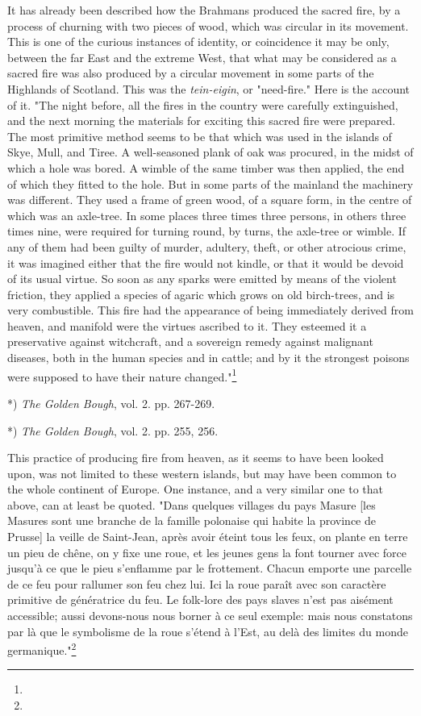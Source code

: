 \documentclass[a4paper, 11pt, oneside, polutonikogreek, english]{article}
\begin{document}
It has already been described how the Brahmans produced the sacred fire, by a process of churning with two pieces of wood, which was circular in its movement. This is one of the curious instances of identity, or coincidence it may be only, between the far East and the extreme West, that what may be considered as a sacred fire was also produced by a circular movement in some parts of the Highlands of Scotland. This was the \emph{tein-eigin}, or "need-fire." Here is the account of it. "The night before, all the fires in the country were carefully extinguished, and the next morning the materials for exciting this sacred fire were prepared. The most primitive method seems to be that which was used in the islands of Skye, Mull, and Tiree. A well-seasoned plank of oak was procured, in the midst of which a hole was bored. A wimble of the same timber was then applied, the end of which they fitted to the hole. But in some parts of the mainland the machinery was different. They used a frame of green wood, of a square form, in the centre of which was an axle-tree. In some places three times three persons, in others three times nine, were required for turning round, by turns, the axle-tree or wimble. If any of them had been guilty of murder, adultery, theft, or other atrocious crime, it was imagined either that the fire would not kindle, or that it would be devoid of its usual virtue. So soon as any sparks were emitted by means of the violent friction, they applied a species of agaric which grows on old birch-trees, and is very combustible. This fire had the appearance of being immediately derived from heaven, and manifold were the virtues ascribed to it. They esteemed it a preservative against witchcraft, and a sovereign remedy against malignant diseases, both in the human species and in cattle; and by it the strongest poisons were supposed to have their nature changed."\footnote{}

*) \emph{The Golden Bough}, vol. 2. pp. 267-269.

*) \emph{The Golden Bough}, vol. 2. pp. 255, 256.

This practice of producing fire from heaven, as it seems to have been looked upon, was not limited to these western islands, but may have been common to the whole continent of Europe. One instance, and a very similar one to that above, can at least be quoted. "Dans quelques villages du pays Masure [les Masures sont une branche de la famille polonaise qui habite la province de Prusse] la veille de Saint-Jean, après avoir éteint tous les feux, on plante en terre un pieu de chêne, on y fixe une roue, et les jeunes gens la font tourner avec force jusqu'à ce que le pieu s'enflamme par le frottement. Chacun emporte une parcelle de ce feu pour rallumer son feu chez lui. Ici la roue paraît avec son caractère primitive de génératrice du feu. Le folk-lore des pays slaves n'est pas aisément accessible; aussi devons-nous nous borner à ce seul exemple: mais nous constatons par là que le symbolisme de la roue s'étend à l'Est, au delà des limites du monde germanique."\footnote{}
\end{document}
